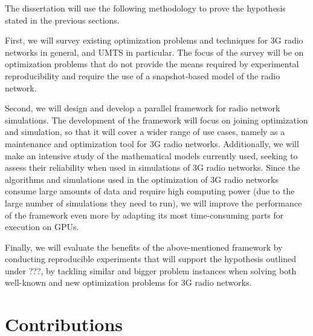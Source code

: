 The dissertation will use the following methodology to prove the hypothesis
stated in the previous sections.

First, we will survey existing optimization problems and techniques
for 3G radio networks in general, and UMTS in particular. The focus
of the survey will be on optimization problems that do not provide
the means required by experimental reproducibility and require the
use of a snapshot-based model of the radio network.

Second, we will design and develop a parallel framework for radio
network simulations. The development of the framework will focus on
joining optimization and simulation, so that it will cover a wider
range of use cases, namely as a maintenance and optimization tool
for 3G radio networks. Additionally, we will make an intensive study
of the mathematical models currently used, seeking to assess their
reliability when used in simulations of 3G radio networks. Since the
algorithms and simulations used in the optimization of 3G radio networks
consume large amounts of data and require high computing power (due
to the large number of simulations they need to run), we will improve
the performance of the framework even more by adapting its most time-consuming
parts for execution on GPUs.

Finally, we will evaluate the benefits of the above-mentioned framework
by conducting reproducible experiments that will support the hypothesis
outlined under ???, by tackling similar and bigger problem instances
when solving both well-known and new optimization problems for 3G
radio networks.


\section{Contributions}

